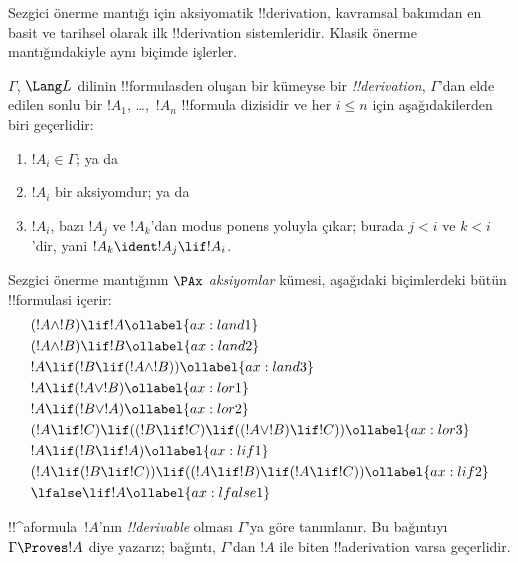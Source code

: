 



Sezgici önerme mantığı için aksiyomatik !!{derivation}, kavramsal bakımdan en
basit ve tarihsel olarak ilk !!{derivation} sistemleridir. Klasik önerme
mantığındakiyle aynı biçimde işlerler.

\begin{defn}[!!^{derivability}]
$\Gamma$, $\Lang L$ dilinin !!{formula}s{}den oluşan bir kümeyse bir
\emph{!!{derivation}}, $\Gamma$'dan elde edilen sonlu bir $!A_1$, \dots,~$!A_n$ !!{formula}
dizisidir ve her $i \le n$ için aşağıdakilerden biri geçerlidir:
\begin{enumerate}
\item $!A_i \in \Gamma$; ya da
\item $!A_i$ bir aksiyomdur; ya da
\item $!A_i$, bazı $!A_j$ ve $!A_k$'dan modus ponens yoluyla çıkar; burada
  $j < i$ ve $k < i$'dir, yani $!A_k \ident !A_j \lif !A_i$.
\end{enumerate}
\end{defn}

\begin{defn}[Aksiyomlar]
Sezgici önerme mantığının $\PAx$ \emph{aksiyomlar} kümesi, aşağıdaki
biçimlerdeki bütün !!{formula}s{}i içerir:
\begin{align}
  & (!A \land !B) \lif !A \ollabel{ax:land1}\\
  & (!A \land !B) \lif !B \ollabel{ax:land2}\\
  & !A \lif (!B \lif (!A \land !B)) \ollabel{ax:land3}\\
  & !A \lif (!A \lor !B) \ollabel{ax:lor1}\\
  & !A \lif (!B \lor !A) \ollabel{ax:lor2}\\
  & (!A \lif !C) \lif ((!B \lif !C) \lif ((!A \lor !B) \lif !C)) \ollabel{ax:lor3}\\
  & !A \lif (!B \lif !A) \ollabel{ax:lif1}\\
  & (!A \lif (!B \lif !C)) \lif ((!A \lif !B) \lif (!A \lif !C)) \ollabel{ax:lif2}\\
  & \lfalse \lif !A \ollabel{ax:lfalse1}
\end{align}
\end{defn}

\begin{defn}[!!^{derivability}]
!!^a{formula}~$!A$'nın \emph{!!{derivable}} olması $\Gamma$'ya göre
tanımlanır. Bu bağıntıyı $\Gamma \Proves !A$ diye yazarız; bağıntı,
$\Gamma$'dan $!A$ ile biten !!a{derivation} varsa geçerlidir.
\end{defn}


